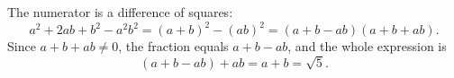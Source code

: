 The numerator is a difference of squares:
\[a^2+2ab+b^2-a^2b^2=(a+b)^2-(ab)^2=(a+b-ab)(a+b+ab).\]
Since $a+b+ab\ne0$, the fraction equals $a+b-ab$, and the whole expression is
\[(a+b-ab)+ab=a+b=\boxed{\sqrt5}.\]

